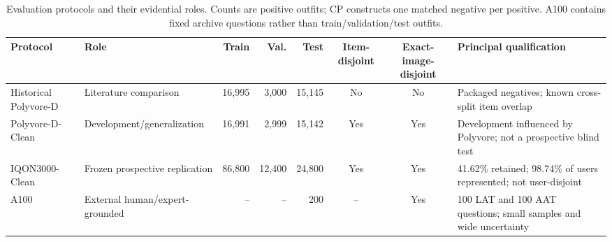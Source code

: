 \begin{table}[htbp]
\caption{Evaluation protocols and their evidential roles. Counts are positive outfits; CP constructs one matched negative per positive. A100 contains fixed archive questions rather than train/validation/test outfits.}
\label{tab:datasets}
\centering
\small
\begin{tabular}{l l r r r c c p{4.0cm}}
\toprule
Protocol & Role & Train & Val. & Test & Item-disjoint & Exact-image-disjoint & Principal qualification \\
\midrule
Historical Polyvore-D & Literature comparison & 16,995 & 3,000 & 15,145 & No & No & Packaged negatives; known cross-split item overlap \\
Polyvore-D-Clean & Development/generalization & 16,991 & 2,999 & 15,142 & Yes & Yes & Development influenced by Polyvore; not a prospective blind test \\
IQON3000-Clean & Frozen prospective replication & 86,800 & 12,400 & 24,800 & Yes & Yes & 41.62\% retained; 98.74\% of users represented; not user-disjoint \\
A100 & External human/expert-grounded & -- & -- & 200 & -- & Yes & 100 LAT and 100 AAT questions; small samples and wide uncertainty \\
\bottomrule
\end{tabular}
\end{table}
